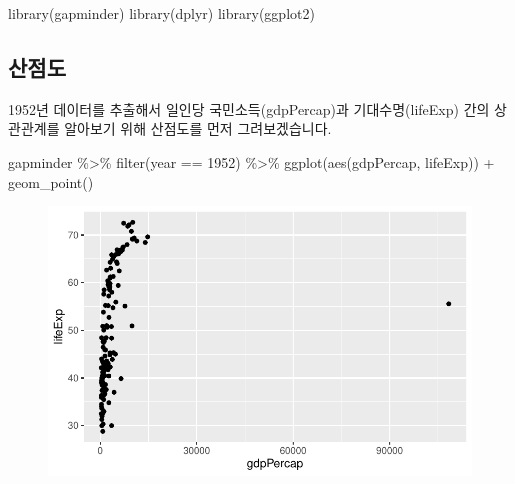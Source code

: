 \documentclass[
  letterpaper,
  DIV=11,
  numbers=noendperiod]{scrartcl}
\newenvironment{Shaded}{\begin{snugshade}}{\end{snugshade}}
\newcommand{\DecValTok}[1]{\textcolor[rgb]{0.68,0.00,0.00}{#1}}
\newcommand{\FunctionTok}[1]{\textcolor[rgb]{0.28,0.35,0.67}{#1}}
\newcommand{\NormalTok}[1]{\textcolor[rgb]{0.00,0.23,0.31}{#1}}
\newcommand{\SpecialCharTok}[1]{\textcolor[rgb]{0.37,0.37,0.37}{#1}}
\begin{document}
\begin{Shaded}
\begin{Highlighting}[]
\FunctionTok{library}\NormalTok{(gapminder)}
\FunctionTok{library}\NormalTok{(dplyr)}
\FunctionTok{library}\NormalTok{(ggplot2)}
\end{Highlighting}
\end{Shaded}

\hypertarget{uxc0b0uxc810uxb3c4}{%
\subsection{산점도}\label{uxc0b0uxc810uxb3c4}}

1952년 데이터를 추출해서 일인당 국민소득(gdpPercap)과 기대수명(lifeExp)
간의 상관관계를 알아보기 위해 산점도를 먼저 그려보겠습니다.

\begin{Shaded}
\begin{Highlighting}[]
\NormalTok{gapminder }\SpecialCharTok{\%\textgreater{}\%}
  \FunctionTok{filter}\NormalTok{(year }\SpecialCharTok{==} \DecValTok{1952}\NormalTok{) }\SpecialCharTok{\%\textgreater{}\%}
  \FunctionTok{ggplot}\NormalTok{(}\FunctionTok{aes}\NormalTok{(gdpPercap, lifeExp)) }\SpecialCharTok{+} 
  \FunctionTok{geom\_point}\NormalTok{()}
\end{Highlighting}
\end{Shaded}

\begin{figure}[H]

{\centering \includegraphics{LinearRegression_files/figure-pdf/unnamed-chunk-2-1.pdf}

}

\end{figure}
\end{document}
